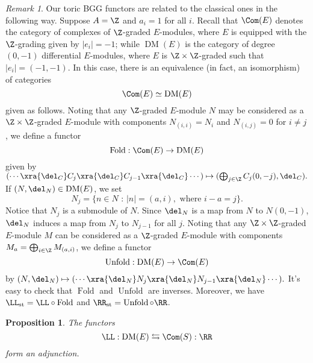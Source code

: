 \documentclass[12pt]{amsart}
\newtheorem{prop}[lemma]{Proposition}
\theoremstyle{definition}
\theoremstyle{remark}
\newtheorem{remark}[lemma]{Remark}
\def\on{\operatorname}
\def\DM{\operatorname{DM}}
\begin{document}
\begin{remark}\label{rmk:PPn DM is complexes}
Our toric BGG functors are related to the classical ones in the following way. Suppose $A = \Z$ and $a_i = 1$ for all $i$. Recall that $\Com(E)$ denotes the category of complexes of $\Z$-graded $E$-modules, where $E$ is equipped with the $\Z$-grading given by $|e_i| = -1$; while $\DM(E)$ is the category of degree $(0, -1)$ differential $E$-modules, where $E$ is $\Z \times \Z$-graded such that $|e_i| = (-1, -1)$. In this case, there is an equivalence (in fact, an isomorphism) of categories
$$
\Com(E) \simeq \DM(E)
$$
given as follows. Noting that any $\Z$-graded $E$-module $N$ may be considered as a $\Z \times \Z$-graded $E$-module with components $N_{(i, i)} = N_i$ and $N_{(i, j)} = 0$ for $i \ne j$, we define a functor
$$
\on{Fold} : \Com(E) \to \DM(E)
$$
given by $(\cdots \xra{\del_C} C_j \xra{\del_C} C_{j-1} \xra{\del_C} \cdots) \mapsto (\bigoplus_{j \in \Z} C_j(0, -j), \del_C).$ If $(N, \del_N) \in \DM(E)$, we set
$$
N_j = \{n \in N \text{ : } |n| = (a, i), \text{ where } i - a = j\}.
$$
Notice that $N_j$ is a submodule of $N$. Since $\del_N$ is a map from $N$ to $N(0, -1)$, $\del_N$ induces a map from $N_j$ to $N_{j -1}$ for all $j$. Noting that any $\Z \times \Z$-graded $E$-module $M$ can be considered as a $\Z$-graded $E$-module with components $M_a = \bigoplus_{i  \in \Z} M_{(a, i)}$, we define a functor
$$
\on{Unfold} : \DM(E) \to \Com(E)
$$
by $(N, \del_N) \mapsto (\cdots \xra{\del_N} N_j \xra{\del_N} N_{j-1} \xra{\del_N} \cdots ).$ It's easy to check that $\on{Fold}$ and $\on{Unfold}$ are inverses. Moreover, we have $\LL_{\on{st}} = \LL \circ \on{Fold}$ and $\RR_{\on{st}} = \on{Unfold} \circ \RR$.
\end{remark}


\begin{prop}
The functors
$$
\LL :  \DM(E) \leftrightarrows \Com(S) : \RR
$$
form an adjunction.
\end{prop}
\end{document}
